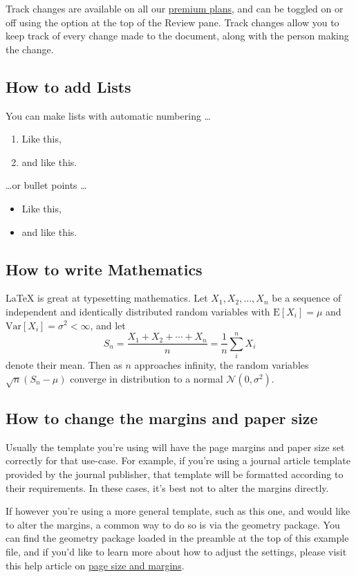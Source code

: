 \documentclass{article}
\begin{document}
Track changes are available on all our \href{https://www.overleaf.com/user/subscription/plans}{premium plans}, and can be toggled on or off using the option at the top of the Review pane. Track changes allow you to keep track of every change made to the document, along with the person making the change. 

\subsection{How to add Lists}

You can make lists with automatic numbering \dots

\begin{enumerate}
\item Like this,
\item and like this.
\end{enumerate}
\dots or bullet points \dots
\begin{itemize}
\item Like this,
\item and like this.
\end{itemize}

\subsection{How to write Mathematics}

\LaTeX{} is great at typesetting mathematics. Let $X_1, X_2, \ldots, X_n$ be a sequence of independent and identically distributed random variables with $\text{E}[X_i] = \mu$ and $\text{Var}[X_i] = \sigma^2 < \infty$, and let
\[S_n = \frac{X_1 + X_2 + \cdots + X_n}{n}
      = \frac{1}{n}\sum_{i}^{n} X_i\]
denote their mean. Then as $n$ approaches infinity, the random variables $\sqrt{n}(S_n - \mu)$ converge in distribution to a normal $\mathcal{N}(0, \sigma^2)$.


\subsection{How to change the margins and paper size}

Usually the template you're using will have the page margins and paper size set correctly for that use-case. For example, if you're using a journal article template provided by the journal publisher, that template will be formatted according to their requirements. In these cases, it's best not to alter the margins directly.

If however you're using a more general template, such as this one, and would like to alter the margins, a common way to do so is via the geometry package. You can find the geometry package loaded in the preamble at the top of this example file, and if you'd like to learn more about how to adjust the settings, please visit this help article on \href{https://www.overleaf.com/learn/latex/page_size_and_margins}{page size and margins}.
\end{document}
